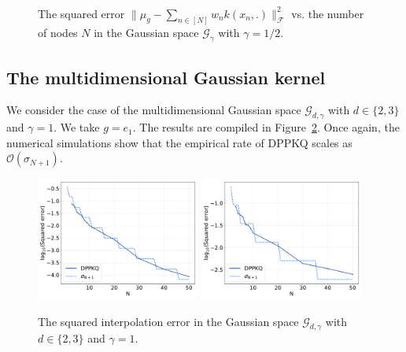\documentclass[twoside,11pt]{book}
\numberwithin{theorem}{chapter}
\numberwithin{definition}{chapter}
\numberwithin{proposition}{chapter}
\numberwithin{corollary}{chapter}
\numberwithin{example}{chapter}
\numberwithin{lemma}{chapter}
\numberwithin{assumption}{chapter}
\numberwithin{equation}{chapter}
\numberwithin{figure}{chapter}
\begin{document}
\begin{figure}
\\
\caption{The squared error $\|\mu_{g}-\sum\limits_{n \in [N]} w_{n}k(x_{n},.)\|_{\mathcal{F}}^{2}$ vs. the number of nodes $N$ in the Gaussian space $\mathcal{G}_{\gamma}$ with $\gamma = 1/2$.\label{fig:unidim_gaussian_dppkq}}
\end{figure}




\subsection{The multidimensional Gaussian kernel}\label{s:multigaussian_numsim}

We consider the case of the multidimensional Gaussian space $\mathcal{G}_{d,\gamma}$ with $d \in \{2,3\}$ and $\gamma = 1$. We take $g = e_{1}$. The results are compiled in Figure~\ref{fig:GaussianResult}.
Once again, the numerical simulations show that the empirical rate of DPPKQ scales as $\mathcal{O}(\sigma_{N+1})$. 

\begin{figure}[]
    \centering
\includegraphics[width= 0.48\textwidth]{img/neurips/multiHermite/Gaussian_2D_kernel_scale_1_fig_L.pdf}
\includegraphics[width= 0.48\textwidth]{img/neurips/multiHermite/Gaussian_3D_kernel_scale_1_fig_L.pdf} \\
\caption{The squared interpolation error in the Gaussian space $\mathcal{G}_{d,\gamma}$ with $d \in \{2,3\}$ and $\gamma=1$. \label{fig:GaussianResult}}
\end{figure}
\end{document}
